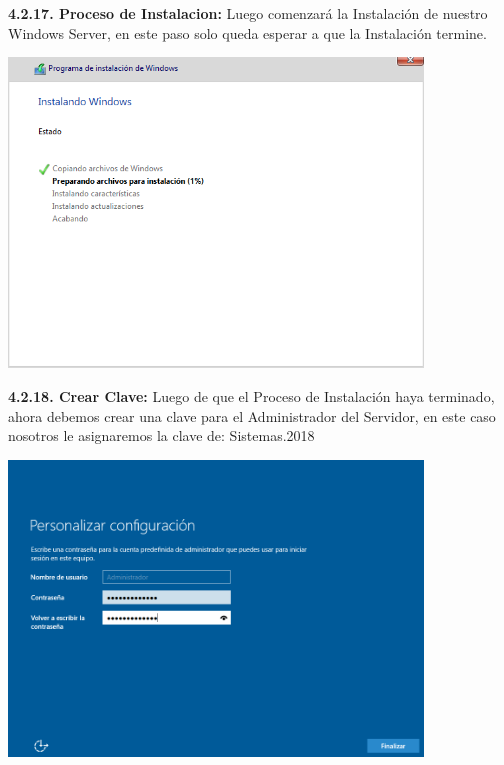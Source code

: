 \textbf {4.2.17. Proceso de Instalacion:} Luego comenzará la Instalación de nuestro Windows Server, en este paso solo queda esperar a que la Instalación termine.
\begin{center}
  \includegraphics[width=11cm]{Imagenes/Proceso_Instalacion.png}
\end{center}

\textbf {4.2.18. Crear Clave:} Luego de que el Proceso de Instalación haya terminado, ahora debemos crear una clave para el Administrador del Servidor, en este caso nosotros le asignaremos la clave de: Sistemas.2018
\begin{center}
  \includegraphics[width=11cm]{Imagenes/Crear_Clave.png}
\end{center}
\break

